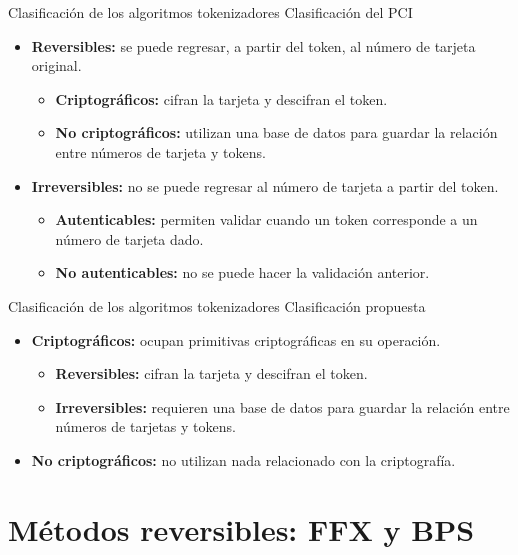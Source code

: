 \documentclass{beamer}
\begin{document}
  \begin{frame}{Clasificación de los algoritmos tokenizadores}
    {Clasificación del PCI \cite{pci_tokens}}
    \begin{itemize}
      \item \textbf{Reversibles:} se puede regresar, a partir del token, al
        número de tarjeta original.
        \begin{itemize}
          \item \textbf{Criptográficos:} cifran la tarjeta y descifran el
            token.
          \item \textbf{No criptográficos:} utilizan una base de datos para
            guardar la relación entre números de tarjeta y tokens.
        \end{itemize}
      \item \textbf{Irreversibles:} no se puede regresar al número de tarjeta a
        partir del token.
        \begin{itemize}
          \item \textbf{Autenticables:} permiten validar cuando un token
            corresponde a un número de tarjeta dado.
          \item \textbf{No autenticables:} no se puede hacer la validación
            anterior.
        \end{itemize}
    \end{itemize}
  \end{frame}

  \begin{frame}{Clasificación de los algoritmos tokenizadores}
    {Clasificación propuesta}
    \begin{itemize}
      \item \textbf{Criptográficos:} ocupan primitivas criptográficas en su
        operación.
      \begin{itemize}
        \item \textbf{Reversibles:} cifran la tarjeta y descifran el
          token.
        \item \textbf{Irreversibles:} requieren una base de datos para
          guardar la relación entre números de tarjetas y tokens.
      \end{itemize}
      \item \textbf{No criptográficos:} no utilizan nada relacionado con la
          criptografía.
    \end{itemize}
  \end{frame}

  \section{Métodos reversibles: FFX y BPS}
\end{document}
